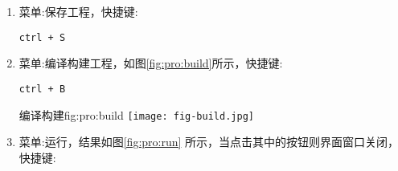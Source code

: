 \documentclass[11pt,twoside]{article} %
\begin{document}
\begin{enumerate}
\begin{insertfigure}{选择主界面基类}{fig:pro:class}{}%
  \centering
  \texttt{[image: fig-mainclass-ui.jpg]}
\end{insertfigure}

双击界面文件mainwindow.ui，用designer编辑工程中的ui，其中添加一个pushbutton，修改其文本为hello!，
添一个加designer中自带的信号和槽，pushbutton的clicked，到 mainwindows的close()，完成如图\ref{fig:pro:ui}所示。

\begin{insertfigure}{编辑ui界面添加信号槽}{fig:pro:ui}{}%
  \centering
  \texttt{[image: fig-uidesign-signal-slot.jpg]}
\end{insertfigure}

\item 菜单:保存工程，快捷键:

\lstinline!ctrl + S!

\item 菜单:编译构建工程，如图\ref{fig:pro:build}所示，快捷键:

\lstinline!ctrl + B!

\begin{insertfigure}{编译构建}{fig:pro:build}{}%
  \centering
  \texttt{[image: fig-build.jpg]}
\end{insertfigure}

\item 菜单:运行，结果如图\ref{fig:pro:run} 所示，当点击其中的按钮则界面窗口关闭，快捷键:


\end{enumerate}
\end{document}
